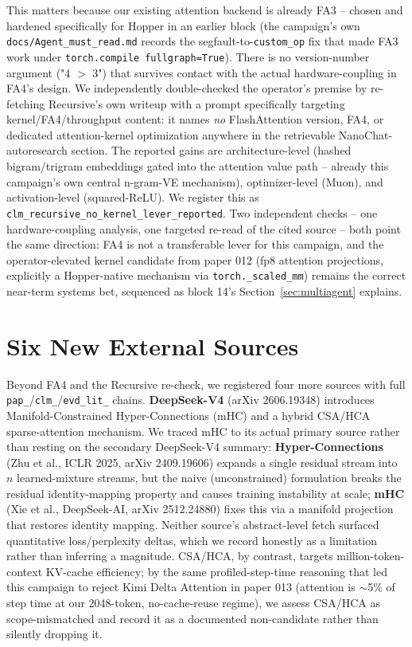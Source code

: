 \documentclass{article}
\begin{document}
This matters because our existing attention backend is already FA3 -- chosen and hardened specifically for Hopper in an earlier block (the campaign's own \texttt{docs/Agent\_must\_read.md} records the segfault-to-\texttt{custom\_op} fix that made FA3 work under \texttt{torch.compile fullgraph=True}). There is no version-number argument ("4 $>$ 3") that survives contact with the actual hardware-coupling in FA4's design. We independently double-checked the operator's premise by re-fetching Recursive's own writeup with a prompt specifically targeting kernel/FA4/throughput content: it names \emph{no} FlashAttention version, FA4, or dedicated attention-kernel optimization anywhere in the retrievable NanoChat-autoresearch section. The reported gains are architecture-level (hashed bigram/trigram embeddings gated into the attention value path -- already this campaign's own central n-gram-VE mechanism), optimizer-level (Muon), and activation-level (squared-ReLU). We register this as \texttt{clm\_recursive\_no\_kernel\_lever\_reported}. Two independent checks -- one hardware-coupling analysis, one targeted re-read of the cited source -- both point the same direction: FA4 is not a transferable lever for this campaign, and the operator-elevated kernel candidate from paper 012 (fp8 attention projections, explicitly a Hopper-native mechanism via \texttt{torch.\_scaled\_mm}) remains the correct near-term systems bet, sequenced as block 14's Section~\ref{sec:multiagent} explains.

\section{Six New External Sources}
\label{sec:literature}
Beyond FA4 and the Recursive re-check, we registered four more sources with full \texttt{pap\_}/\texttt{clm\_}/\texttt{evd\_lit\_} chains. \textbf{DeepSeek-V4} (arXiv 2606.19348) introduces Manifold-Constrained Hyper-Connections (mHC) and a hybrid CSA/HCA sparse-attention mechanism. We traced mHC to its actual primary source rather than resting on the secondary DeepSeek-V4 summary: \textbf{Hyper-Connections} (Zhu et al., ICLR 2025, arXiv 2409.19606) expands a single residual stream into $n$ learned-mixture streams, but the naive (unconstrained) formulation breaks the residual identity-mapping property and causes training instability at scale; \textbf{mHC} (Xie et al., DeepSeek-AI, arXiv 2512.24880) fixes this via a manifold projection that restores identity mapping. Neither source's abstract-level fetch surfaced quantitative loss/perplexity deltas, which we record honestly as a limitation rather than inferring a magnitude. CSA/HCA, by contrast, targets million-token-context KV-cache efficiency; by the same profiled-step-time reasoning that led this campaign to reject Kimi Delta Attention in paper 013 (attention is $\sim$5\% of step time at our 2048-token, no-cache-reuse regime), we assess CSA/HCA as scope-mismatched and record it as a documented non-candidate rather than silently dropping it.
\end{document}
